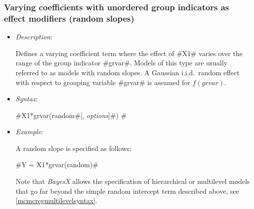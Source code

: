 




\subsubsection*{Varying coefficients with unordered group indicators as effect modifiers
(random slopes)}


\begin{itemize}
\item[] {\em Description}:

Defines a varying coefficient term where the effect of #X1# varies
over the range of the group indicator #grvar#. Models of this type
are usually referred to as models with random slopes. A Gaussian
i.i.d.~random effect with respect to grouping variable #grvar# is
assumed for $f(grvar)$.
\item[]{\em Syntax}:

#X1*grvar(random#[, {\em options}]#) #
\item[] {\em Example}:

A random slope  is specified as follows:

#Y = X1*grvar(random)#

Note that {\em BayesX} allows the specification of hierarchical or multilevel models that go far beyond
the simple random intercept term described above, see \autoref{mcmcregmultilevelsyntax}.
\end{itemize}


